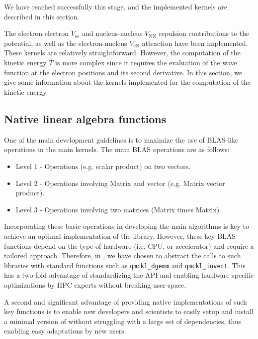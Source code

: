 We have reached successfully this stage, and the implemented kernels are
described in this section.

The electron-electron $V_{\text{ee}}$ and nucleus-nucleus $V_{\text{NN}}$
repulsion contributions to the potential, as well as the electron-nucleus
$V_{\text{eN}}$ attraction have been implemented. These kernels are relatively
straightforward. However, the computation of the kinetic energy $\hat{T}$ is
more complex since it requires the evaluation of the wave function at the
electron positions and its second derivative. In this section, we give some
information about the kernels implemented for the computation of the kinetic
energy.

\subsection{Native linear algebra functions}

One of the main development guidelines is to maximize the use
of \ac{BLAS}-like operations in the main kernels. The main \ac{BLAS} operations are
as follows:

\begin{itemize}
\item Level 1 - Operations (e.g. scalar product) on two vectors.
\item Level 2 - Operations involving Matrix and vector (e.g. Matrix vector product).
\item Level 3 - Operations involving two matrices (Matrix times Matrix).
\end{itemize}

Incorporating these basic operations in developing the main algorithms is key to
achieve an optimal implementation of the library. However, these key \ac{BLAS}
functions depend on the type of hardware (i.e. CPU, or accelerator) and require a
tailored approach. Therefore, in \QMCkl{}, we have chosen to abstract the
calls to such libraries with standard \QMCkl{} functions such as
\texttt{qmckl_dgemm} and \texttt{qmckl_invert}. This has a
two-fold advantage of standardizing the \ac{API} and enabling hardware specific
optimizations by \ac{HPC} experts without breaking user-space.

A second and significant advantage of providing native implementations of
such key functions is to enable new developers and scientists to easily
setup and install a minimal version of \QMCkl{} without struggling with
a large set of dependencies, thus enabling easy adaptations by new users.

